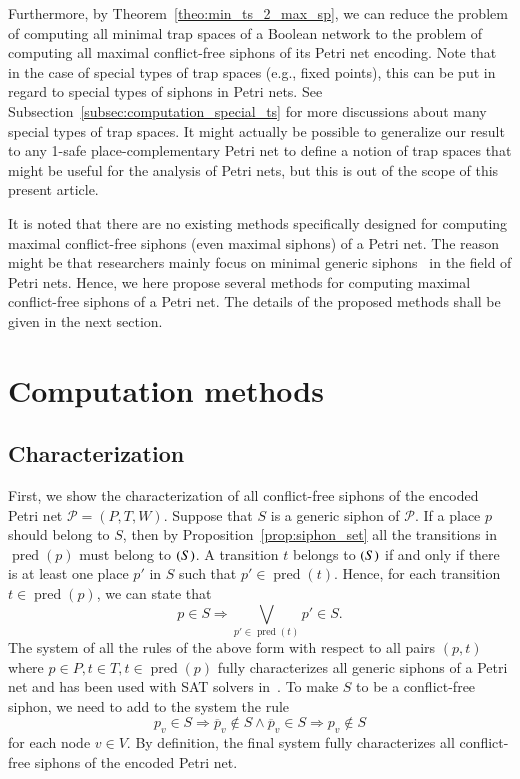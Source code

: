 \documentclass[preprint,12pt]{elsarticle}
\DeclareMathOperator{\pred}{pred}
\let\succ\relax
\DeclareMathOperator{\succ}{succ}
\begin{document}
Furthermore, by Theorem~\ref{theo:min_ts_2_max_sp}, we can reduce the problem of computing all minimal trap spaces of a Boolean network to the problem of computing all maximal conflict-free siphons of its Petri net encoding.
Note that in the case of special types of trap spaces (e.g., fixed points), this can be put in regard to special types of siphons in Petri nets.
See Subsection~\ref{subsec:computation_special_ts} for more discussions about many special types of trap spaces.
It might actually be possible to generalize our result to any 1-safe place-complementary Petri net to define a notion of trap spaces that might be useful for the analysis of Petri nets, but this is out of the scope of this present article.

It is noted that there are no existing methods specifically designed for computing maximal conflict-free siphons (even maximal siphons) of a Petri net.
The reason might be that researchers mainly focus on minimal generic siphons~\cite{DBLP:journals/isci/LiuB16} in the field of Petri nets.
Hence, we here propose several methods for computing maximal conflict-free siphons of a Petri net.
The details of the proposed methods shall be given in the next section.

\section{Computation methods}%
\label{sec:Computation}

\subsection{Characterization}%
\label{subsec:siphon_characterization}

First, we show the characterization of all conflict-free siphons of the encoded Petri net \(\mathcal{P} = (P, T, W)\).
Suppose that \(S\) is a generic siphon of \(\mathcal{P}\). If a place \(p\) should belong to \(S\), then by Proposition~\ref{prop:siphon_set} all the transitions in \(\pred(p)\) must belong to \(\succ(S)\).
A transition \(t\) belongs to \(\succ(S)\) if and only if there is at least one place \(p'\) in \(S\) such that \(p' \in \pred(t)\).
Hence, for each transition \(t \in \pred(p)\), we can state that
\begin{equation}
\label{eq:siphon}
p \in S \Rightarrow \bigvee_{p' \in \pred(t)}p' \in S.
\end{equation}
The system of all the rules of the above form with respect to all pairs \((p, t)\) where \(p \in P, t \in T, t \in \pred(p)\) fully characterizes all generic siphons of a Petri net and has been used with SAT solvers in~\cite{oanea2010new,nabli2016enumerating}.
To make \(S\) to be a conflict-free siphon, we need to add to the system the rule
\begin{equation}
\label{eq:conflict}
p_v \in S \Rightarrow \overline{p}_v \not \in S \wedge \overline{p}_v \in S \Rightarrow p_v \not \in S
\end{equation}for each node \(v \in V\).
By definition, the final system fully characterizes all conflict-free siphons of the encoded Petri net.
\end{document}
